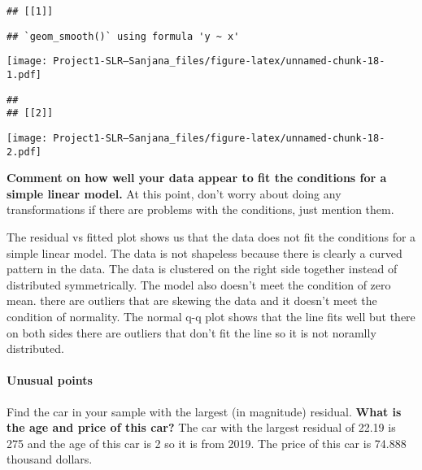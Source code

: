 \documentclass[
]{article}
\newenvironment{Shaded}{\begin{snugshade}}{\end{snugshade}}
\newcommand{\AttributeTok}[1]{\textcolor[rgb]{0.77,0.63,0.00}{#1}}
\newcommand{\FunctionTok}[1]{\textcolor[rgb]{0.00,0.00,0.00}{#1}}
\newcommand{\NormalTok}[1]{#1}
\newcommand{\OtherTok}[1]{\textcolor[rgb]{0.56,0.35,0.01}{#1}}
\newcommand{\SpecialCharTok}[1]{\textcolor[rgb]{0.00,0.00,0.00}{#1}}
\begin{document}
\begin{verbatim}
## [[1]]
\end{verbatim}

\begin{verbatim}
## `geom_smooth()` using formula 'y ~ x'
\end{verbatim}

\texttt{[image: Project1-SLR--Sanjana\_files/figure-latex/unnamed-chunk-18-1.pdf]}

\begin{verbatim}
## 
## [[2]]
\end{verbatim}

\texttt{[image: Project1-SLR--Sanjana\_files/figure-latex/unnamed-chunk-18-2.pdf]}

\textbf{Comment on how well your data appear to fit the conditions for a
simple linear model.} At this point, don't worry about doing any
transformations if there are problems with the conditions, just mention
them.

The residual vs fitted plot shows us that the data does not fit the
conditions for a simple linear model. The data is not shapeless because
there is clearly a curved pattern in the data. The data is clustered on
the right side together instead of distributed symmetrically. The model
also doesn't meet the condition of zero mean. there are outliers that
are skewing the data and it doesn't meet the condition of normality. The
normal q-q plot shows that the line fits well but there on both sides
there are outliers that don't fit the line so it is not noramlly
distributed.

\hypertarget{unusual-points}{%
\paragraph{Unusual points}\label{unusual-points}}

Find the car in your sample with the largest (in magnitude) residual.
\textbf{What is the age and price of this car?} The car with the largest
residual of 22.19 is 275 and the age of this car is 2 so it is from
2019. The price of this car is 74.888 thousand dollars.

\begin{Shaded}
\end{Shaded}
\end{document}
